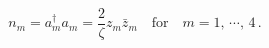 \begin{equation}
n_m=a_m^{\dagger}a_m=\frac{2}{\zeta} z_m\bar{z}_m\quad 
\textrm{for}\quad m=1,\,\cdots,\,4\,.\label{eq:5.4}
\end{equation}

